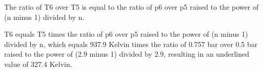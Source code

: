 The ratio of T6 over T5 is equal to the ratio of p6 over p5 raised to the power of (n minus 1) divided by n.

T6 equals T5 times the ratio of p6 over p5 raised to the power of (n minus 1) divided by n, which equals 937.9 Kelvin times the ratio of 0.757 bar over 0.5 bar raised to the power of (2.9 minus 1) divided by 2.9, resulting in an underlined value of 327.4 Kelvin.